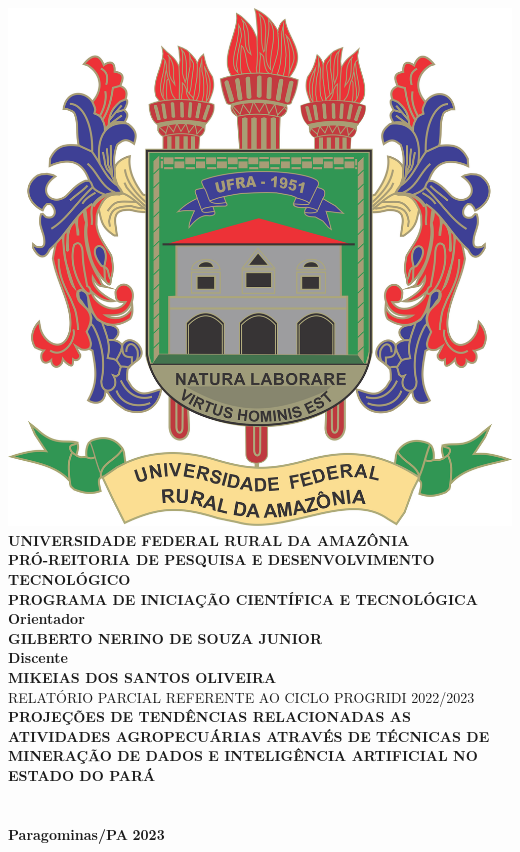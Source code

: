 \thispagestyle{empty}
    \begin{center}
        
        \includegraphics[scale=0.1]{Brasão_ufra.png}\\
        \vspace{0.25cm}
        \textbf{UNIVERSIDADE FEDERAL RURAL DA AMAZÔNIA}\\
        \textbf{PRÓ-REITORIA DE PESQUISA E DESENVOLVIMENTO TECNOLÓGICO}\\
        \textbf{PROGRAMA DE INICIAÇÃO CIENTÍFICA E TECNOLÓGICA}\\
        \vspace{2cm}
         \textbf{Orientador \\ GILBERTO NERINO DE SOUZA JUNIOR}\\
        \vspace{0.5cm}
        \textbf{Discente \\ MIKEIAS DOS SANTOS OLIVEIRA}\\
        \vspace{1cm}
        RELATÓRIO PARCIAL REFERENTE AO CICLO PROGRIDI 2022/2023\\
        \vspace{2cm}
        \textbf{PROJEÇÕES DE TENDÊNCIAS RELACIONADAS AS ATIVIDADES AGROPECUÁRIAS ATRAVÉS DE TÉCNICAS DE MINERAÇÃO DE DADOS E INTELIGÊNCIA ARTIFICIAL NO ESTADO DO PARÁ}\\
        \vspace{2cm}
        \\
        \\
        \vspace{2cm}
        \textbf{Paragominas/PA}
        \textbf{2023}\\
        \vspace{1.5cm}
  
    \end{center}
